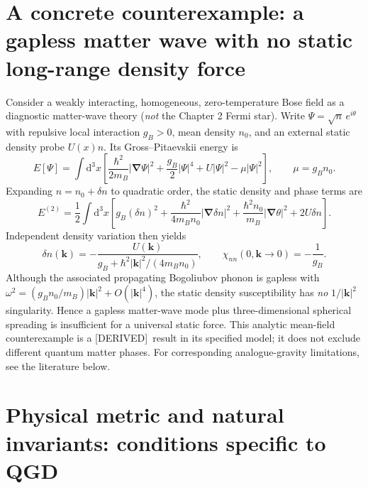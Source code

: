 \documentclass[11pt,a4paper]{article}
\theoremstyle{remark}\newtheorem{remark}[theorem]{Remark}
\newcommand{\dd}{\mathrm d}\newcommand{\Tr}{\operatorname{Tr}}\newcommand{\cO}{\mathcal O}\newcommand{\cG}{\mathcal G}\newcommand{\cH}{\mathcal H}\newcommand{\cE}{\mathcal E}\newcommand{\cK}{\mathcal K}\newcommand{\AX}{\textsf{[AXIOM]}}\newcommand{\D}{\textsf{[DERIVED]}}\newcommand{\C}{\textsf{[CONDITIONAL]}}\newcommand{\OPEN}{\textsf{[OPEN]}}
\begin{document}
\section{A concrete counterexample: a gapless matter wave with no static long-range density force}
Consider a weakly interacting, homogeneous, zero-temperature Bose field as a diagnostic matter-wave theory (\emph{not} the Chapter 2 Fermi star). Write $\Psi=\sqrt n\,e^{i\theta}$ with repulsive local interaction $g_B>0$, mean density $n_0$, and an external static density probe $U(x)n$. Its Gross--Pitaevskii energy is
\begin{equation}\label{eq:gp-energy}
E[\Psi]=\int\!\dd^3x\left[\frac{\hbar^2}{2m_B}|\bm\nabla\Psi|^2+\frac{g_B}{2}|\Psi|^4+U|\Psi|^2-\mu|\Psi|^2\right],\qquad \mu=g_Bn_0.
\end{equation}
Expanding $n=n_0+\delta n$ to quadratic order, the static density and phase terms are
\begin{equation}\label{eq:gp-quadratic}
E^{(2)}=\frac12\int\!\dd^3x\left[g_B(\delta n)^2+\frac{\hbar^2}{4m_Bn_0}|\bm\nabla\delta n|^2+\frac{\hbar^2 n_0}{m_B}|\bm\nabla\theta|^2+2U\delta n\right].
\end{equation}
Independent density variation then yields
\begin{equation}\label{eq:gp-chi}
\boxed{\delta n(\bm k)=-\frac{U(\bm k)}{g_B+\hbar^2|\bm k|^2/(4m_Bn_0)},\qquad \chi_{nn}(0,\bm k\to0)=-\frac1{g_B}.}
\end{equation}
Although the associated propagating Bogoliubov phonon is gapless with $\omega^2=(g_Bn_0/m_B)|\bm k|^2+O(|\bm k|^4)$, the static density susceptibility has \emph{no} $1/|\bm k|^2$ singularity. Hence a gapless matter-wave mode plus three-dimensional spherical spreading is insufficient for a universal static force. This analytic mean-field counterexample is a \D\ result in its specified model; it does not exclude different quantum matter phases. For corresponding analogue-gravity limitations, see the literature below.

\section{Physical metric and natural invariants: conditions specific to QGD}
\end{document}
